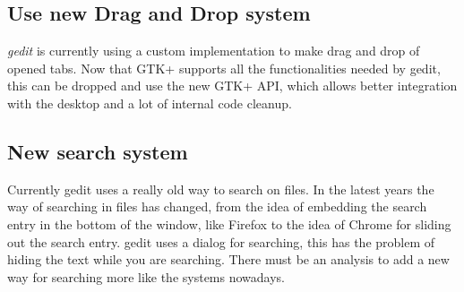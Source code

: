 \subsection{Use new Drag and Drop system}\label{sec:DND}

\emph{gedit} is currently using a custom implementation to make drag and drop of opened tabs. Now that GTK+ supports all the functionalities needed by gedit, this can be dropped and use the new GTK+ API, which allows better integration with the desktop and a lot of internal code cleanup.

\subsection{New search system}\label{sec:SearchSystem}

Currently gedit uses a really old way to search on files. In the latest years the way of searching in files has changed, from the idea of embedding the search entry in the bottom of the window, like Firefox to the idea of Chrome for sliding out the search entry. gedit uses a dialog for searching, this has the problem of hiding the text while you are searching. There must be an analysis to add a new way for searching more like the systems nowadays.
